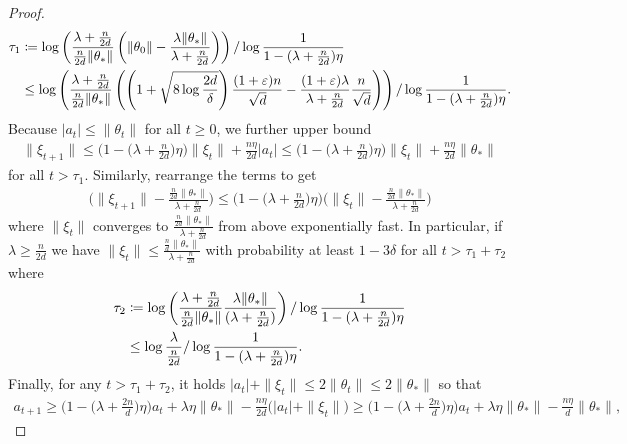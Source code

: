 \begin{proof}
    \begin{align*}
        \tau_1 & \coloneqq \log\left(\frac{\lambda+\frac{n}{2d}}{\frac{n}{2d}\|\theta_*\|} \left(\|\theta_0\| - \frac{\lambda\|\theta_*\|}{\lambda + \frac{n}{2d}}\right)\right)/\log\frac{1}{1 - (\lambda+\frac{n}{2d})\eta} \\
        & \leq \log\left(\frac{\lambda+\frac{n}{2d}}{\frac{n}{2d}\|\theta_*\|} \left(\left(1 + \sqrt{8\log\frac{2d}{\delta}}\right)\frac{(1+\varepsilon)n}{\sqrt{d}} - \frac{(1+\varepsilon)\lambda}{\lambda + \frac{n}{2d}}\frac{n}{\sqrt{d}}\right)\right)/\log\frac{1}{1 - (\lambda+\frac{n}{2d})\eta}.
    \end{align*}
    Because $|a_t|\leq \|\theta_t\|$ for all $t\geq 0$, we further upper bound 
    \begin{align*}
        \|\xi_{t+1}\| \leq \Big(1-\Big(\lambda + \frac{n}{2d}\Big)\eta \Big)\|\xi_t\| + \frac{n\eta}{2d}|a_t| \leq \Big(1-\Big(\lambda + \frac{n}{2d}\Big)\eta \Big)\|\xi_t\| + \frac{n\eta}{2d}\|\theta_*\|
    \end{align*}
    for all $t>\tau_1$. 
    Similarly, rearrange the terms to get
    \begin{align*}
        \Big(\|\xi_{t+1}\| - \frac{\frac{n}{2d}\|\theta_*\|}{\lambda + \frac{n}{2d}}\Big) \leq \Big(1-\Big(\lambda + \frac{n}{2d}\Big)\eta \Big) \Big(\|\xi_t\| - \frac{\frac{n}{2d}\|\theta_*\|}{\lambda + \frac{n}{2d}}\Big)
    \end{align*}
    where $\|\xi_t\|$ converges to $\frac{\frac{n}{2d}\|\theta_*\|}{\lambda + \frac{n}{2d}}$ from above exponentially fast. 
    In particular, if $\lambda\geq \frac{n}{2d}$ we have $\|\xi_t\| \leq \frac{\frac{n}{d}\|\theta_*\|}{\lambda + \frac{n}{2d}}$ with probability at least $1-3\delta$ for all $t>\tau_1+\tau_2$ where 
    \begin{align*}
        \tau_2 & \coloneqq \log \left( \frac{\lambda+\frac{n}{2d}}{\frac{n}{2d}\|\theta_*\|} \frac{\lambda\|\theta_*\|}{(\lambda + \frac{n}{2d})} \right)/\log\frac{1}{1 - (\lambda+\frac{n}{2d})\eta} \\
        & \leq \log\frac{\lambda}{\frac{n}{2d}}/\log\frac{1}{1 - (\lambda+\frac{n}{2d})\eta}.
    \end{align*}
    Finally, for any $t>\tau_1+\tau_2$, it holds $|a_t|+\|\xi_t\|\leq 2\|\theta_t\|\leq 2\|\theta_*\|$ so that 
    \begin{align*}
        a_{t+1}\geq \Big(1-\Big(\lambda + \frac{2n}{d}\Big)\eta \Big)a_t+\lambda\eta\|\theta_*\| - \frac{n\eta}{2d} \big(|a_t| + \|\xi_t\|\big)
        \geq  \Big(1-\Big(\lambda + \frac{2n}{d}\Big)\eta \Big)a_t+\lambda\eta\|\theta_*\| - \frac{n\eta}{d}\|\theta_*\|,

\end{align*}
\end{proof}
